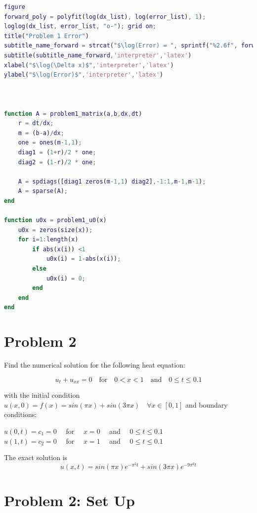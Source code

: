 \documentclass[12pt,letterpaper]{article}
\begin{document}
\begin{lstlisting}[language = Matlab]
figure
forward_poly = polyfit(log(dx_list), log(error_list), 1);
loglog(dx_list, error_list, "o-"); grid on;
title("Problem 1 Error")
subtitle_name_forward = strcat("$\log(Error) = ", sprintf("%2.6f", forward_poly(1)), "\log(\Delta x) + ", sprintf("%2.6f", forward_poly(2)), "$");
subtitle(subtitle_name_forward,'interpreter','latex')
xlabel("$\log(\Delta x)$",'interpreter','latex')
ylabel("$\log(Error)$",'interpreter','latex')



function A = problem1_matrix(a,b,dx,dt)
    r = dt/dx;
    m = (b-a)/dx;
    one = ones(m-1,1);
    diag1 = (1+r)/2 * one;
    diag2 = (1-r)/2 * one;

    A = spdiags([diag1 zeros(m-1,1) diag2],-1:1,m-1,m-1);
    A = sparse(A);
end

function u0x = problem1_u0(x)
    u0x = zeros(size(x));
    for i=1:length(x)
        if abs(x(i)) <1
            u0x(i) = 1-abs(x(i));
        else
            u0x(i) = 0;
        end
    end
end
\end{lstlisting}


\newpage

\section*{Problem 2}

Find the numerical solution for the following heat equation:

\begin{equation*}
u_t + u_{xx} = 0 \quad  \text{for} \quad 0<x<1 \quad \text{and} \quad 0 \le t \le 0.1
\end{equation*}

with the initial condition  $u(x,0)= f(x)= sin(\pi x)+ sin(3\pi x) \quad  \forall x \in [0,1]$ and boundary conditions:
\begin{center}
    $ u(0,t) = c_1 = 0 \quad$ for $\quad x=0 \quad$ and $\quad 0\le t \le 0.1 $ \\
    $ u(1,t) = c_2 = 0 \quad$ for $\quad x=1 \quad$ and $\quad 0\le t \le 0.1 $ 
\end{center}


The exact solution is\: 
\begin{equation*}
    u(x,t) = sin(\pi x)e^{-\pi^2t} + sin(3\pi x)e^{-9\pi^2t}
\end{equation*}



\section*{Problem 2: Set Up}
\end{document}
